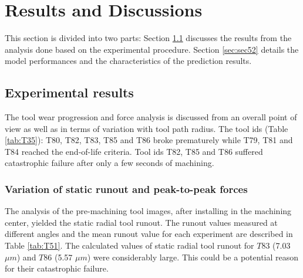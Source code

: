 \documentclass[preprint,review,12pt]{elsarticle}
\begin{document}
\section{Results and Discussions}\label{chap:results}

This section is divided into two parts: Section \ref{sec:sec51} discusses the results from the analysis done based on the experimental procedure. Section \ref{sec:sec52} details the model performances and the characteristics of the prediction results. \par

\subsection{Experimental results}\label{sec:sec51}
The tool wear progression and force analysis is discussed from an overall point of view as well as in terms of variation with tool path radius. The tool ids (Table \ref{tab:T35}): T80, T82, T83, T85 and T86 broke prematurely while T79, T81 and T84 reached the end-of-life criteria. Tool ids T82, T85 and T86 suffered catastrophic failure after only a few seconds of machining. \par

\subsubsection{Variation of static runout and peak-to-peak forces}
The analysis of the pre-machining tool images, after installing in the machining center, yielded the static radial tool runout. The runout values measured at different angles and the mean runout value for each experiment are described in Table \ref{tab:T51}. The calculated values of static radial tool runout for $T83$ (7.03 $\mu{m}$) and $T86$ (5.57 $\mu{m}$) were considerably large. This could be a potential reason for their catastrophic failure. \par
\end{document}
